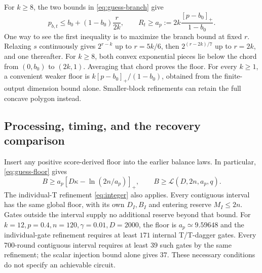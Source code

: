\documentclass[11pt,a4paper]{article}
\numberwithin{equation}{section}
\theoremstyle{remark}\newtheorem*{remark}{Interpretation}
\newcommand{\positive}[1]{\left[#1\right]_+}
\begin{document}
For $k\ge8$, the two bounds in \eqref{eq:guess-branch} give
\begin{equation}
p_{b,t}\le b_0+(1-b_0)\frac r{2k},\qquad
R_t\ge a_p:=2k\frac{[p-b_0]_+}{1-b_0}.
\label{eq:guess-floor}
\end{equation}
One way to see the first inequality is to maximize the branch bound at fixed $r$. Relaxing $s$ continuously gives $2^{r-k}$ up to $r=5k/6$, then $2^{(r-2k)/7}$ up to $r=2k$, and one thereafter. For $k\ge8$, both convex exponential pieces lie below the chord from $(0,b_0)$ to $(2k,1)$. Averaging that chord proves the floor. For every $k\ge1$, a convenient weaker floor is $k[p-b_0]_+/(1-b_0)$, obtained from the finite-output dimension bound alone. Smaller-block refinements can retain the full concave polygon instead.

\subsection{Processing, timing, and the recovery comparison}
Insert any positive score-derived floor into the earlier balance laws. In particular, \eqref{eq:guess-floor} gives
\begin{equation}
B\ge a_p\positive{D\kappa-\ln(2n/a_p)},\qquad
B\ge\mathcal L(D,2n,a_p,q).
\end{equation}
The individual-T refinement \eqref{eq:integer} also applies. Every contiguous interval has the same global floor, with its own $D_I,B_I$ and entering reserve $M_I\le2n$. Gates outside the interval supply no additional reserve beyond that bound. For $k=12,p=0.4,n=120,\gamma=0.01,D=2000$, the floor is $a_p\simeq9.59648$ and the individual-gate refinement requires at least $171$ internal T/T-dagger gates. Every 700-round contiguous interval requires at least $39$ such gates by the same refinement; the scalar injection bound alone gives $37$. These necessary conditions do not specify an achievable circuit.
\end{document}
